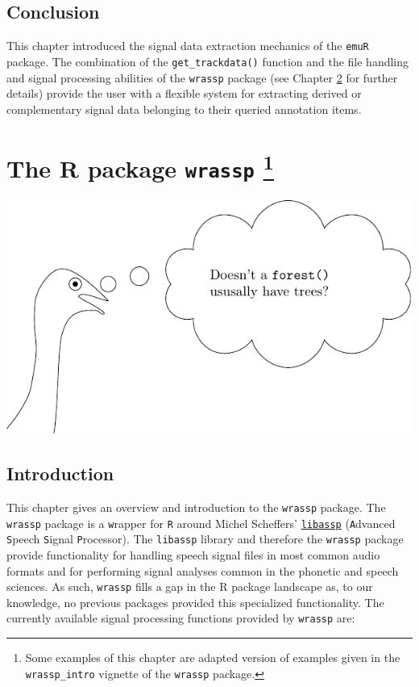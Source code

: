 \documentclass[]{book}
\let\rmarkdownfootnote\footnote%
\def\footnote{\protect\rmarkdownfootnote}
\theoremstyle{definition}
\theoremstyle{definition}
\theoremstyle{definition}
\theoremstyle{remark}
\begin{document}
\hypertarget{conclusion-3}{%
\section{Conclusion}\label{conclusion-3}}

This chapter introduced the signal data extraction mechanics of the
\texttt{emuR} package. The combination of the \texttt{get\_trackdata()}
function and the file handling and signal processing abilities of the
\texttt{wrassp} package (see Chapter \ref{chap:wrassp} for further
details) provide the user with a flexible system for extracting derived
or complementary signal data belonging to their queried annotation
items.

\hypertarget{chap:wrassp}{%
\chapter[The R package \texttt{wrassp} ]{\texorpdfstring{The R package
\texttt{wrassp} \footnote{Some examples of this chapter are adapted
  version of examples given in the \texttt{wrassp\_intro} vignette of
  the \texttt{wrassp} package.}}{The R package wrassp }}\label{chap:wrassp}}

\begin{center}\includegraphics[width=0.75\linewidth]{pics/EMU-webAppEmu_wrassp} \end{center}

\hypertarget{introduction}{%
\section{Introduction}\label{introduction}}

This chapter gives an overview and introduction to the \texttt{wrassp}
package. The \texttt{wrassp} package is a \texttt{w}rapper for
\texttt{R} around Michel Scheffers'
\href{http://libassp.sourceforge.net/}{\texttt{libassp}}
(\texttt{A}dvanced \texttt{S}peech \texttt{S}ignal \texttt{P}rocessor).
The \texttt{libassp} library and therefore the \texttt{wrassp} package
provide functionality for handling speech signal files in most common
audio formats and for performing signal analyses common in the phonetic
and speech sciences. As such, \texttt{wrassp} fills a gap in the R
package landscape as, to our knowledge, no previous packages provided
this specialized functionality. The currently available signal
processing functions provided by \texttt{wrassp} are:
\end{document}
